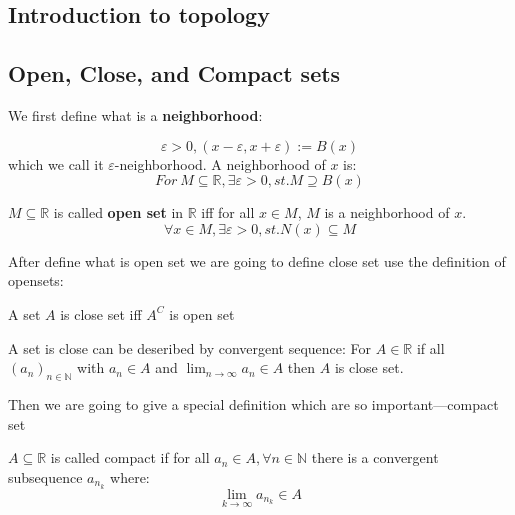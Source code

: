 \documentclass{article}
\newcommand{\R}{\mathbb{R}}
\begin{document}
\clearpage
\subsection{Introduction to topology}
\subsection{Open, Close, and Compact sets}
We first define what is a \textbf{neighborhood}:
\begin{definition}
	\begin{equation*}
		\varepsilon>0, (x-\varepsilon,x+\varepsilon):=B(x)
	\end{equation*}
	which we call it $\varepsilon$-neighborhood. A neighborhood of $x$ is:
	\begin{equation*}
		For\ M\subseteq \R, \exists \varepsilon>0, st. M\supseteq B(x)
	\end{equation*}
\end{definition}

\begin{definition}
	$M\subseteq \R$ is called \textbf{open set} in $\R$ iff for all $x\in M$, $M$ is a neighborhood of $x$.
	\begin{equation*}
		\forall x\in M,\exists \varepsilon>0, st. N(x)\subseteq M
	\end{equation*}
\end{definition}

After define what is open set we are going to define close set use the definition of opensets:
\begin{definition}
	A set $A$ is close set iff $A^{C}$ is open set
\end{definition}
	
 \begin{theorem}\label{Close and convergent}
 	A set is close can be deseribed by convergent sequence: For $A\in \R$ if all $(a_n)_{n\in \mathbb{N}}$ with $a_n\in A$ and $\lim_{n\to \infty}a_n\in A$ then $A$ is close set.
 \end{theorem}

Then we are going to give a special definition which are so important---compact set
\begin{definition}
	$A\subseteq\R$ is called compact if for all $a_n\in A,\forall n\in \mathbb{N}$ there is a convergent subsequence $a_{n_k}$ where:
	\begin{equation*}
		\lim_{k\to \infty}a_{n_k}\in A
	\end{equation*} 
\end{definition}
\end{document}
